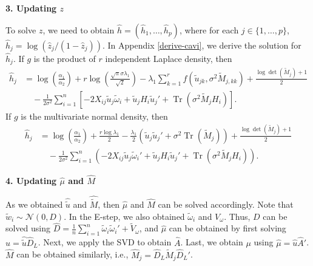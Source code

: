 \documentclass[pdftex, noinfoline, letter]{imsart}
\DeclareMathOperator{\Tr}{Tr}
\theoremstyle{plain}
\begin{document}
{\bf 3. Updating $z$}

To solve $z$, we need to obtain $\widehat  { h} = (\widehat  h_1, \dots, \widehat  h_p)$, where for each $j\in \{1,\ldots,p\}$,
$\widehat  h_j = \log(\widehat  z_j / (1-\widehat  z_j))$. 
In Appendix \ref{derive-cavi}, we derive the solution for $\widehat  h_j$. If $g$ is the product of $r$ independent Laplace density, then
\begin{align}
\label{eqn:cavi-z}
\widehat  h_j & =  
\log \left(\frac{\alpha_1}{\alpha_2}\right) + r \log \left(\frac{\sqrt{\pi} \sigma \lambda_1}{\sqrt{2}}\right)
- \lambda_1 \sum_{k=1}^r f(\widetilde  u_{jk}, \sigma^2 \widetilde  M_{j,kk}) + \frac{\log \det(\widetilde  M_j)+1}{2} 
\nonumber \\
& \quad 
- \frac{1}{2\sigma^2} \sum_{i=1}^n 
\left[
 - 2 X_{ij} \widetilde  u_j \widetilde  \omega_i +\widetilde  u_j H_i \widetilde  u_j' + \Tr(\sigma^2  \widetilde  M_j H_i)
\right].
\end{align} 
If $g$ is the multivariate normal density, then
\begin{align}
\label{eqn:cavi-z-mvn}
  \widehat  h_j & = \log \left(\frac{\alpha_1}{\alpha_2} \right) + \frac{r\log\lambda_1}{2} - 
    \frac{\lambda_1}{2}
    \left(
        \widetilde  u_j \widetilde  u_j'  + \sigma^2 \Tr(\widetilde  M_j)
    \right) + \frac{\log \det (\widetilde  M_j) + 1}{2} \nonumber \\
    & \quad    - \frac{1}{2\sigma^2}
        \sum_{i=1}^n 
        \left(
        - 2X_{ij} \widetilde  u_j \widetilde  \omega_i' + \widetilde  u_j H_i \widetilde  u_j' + \Tr(\sigma^2 \widetilde  M_jH_i)
        \right).
\end{align}
\smallskip

{\bf 4. Updating $\widehat  \mu$ and $\widehat  M$}

As we obtained $\widehat  {\widetilde  u}$ and $\widehat  {\widetilde  M}$, then $\widehat  \mu$ and $\widehat  M$ can be solved accordingly.
Note that $\widetilde  w_i \sim \mathcal{N}(0, D)$. In the E-step, we also obtained $\widetilde  \omega_i$ and $V_\omega$. Thus, $D$ can be solved using $\widehat  D = \frac{1}{n} \sum_{i=1}^n \widetilde  \omega_i \widetilde  \omega_i' + \widetilde  V_\omega$, and $\widehat  \mu$ can be obtained by first solving $\widehat  u = \widehat  {\widetilde  u} \widehat  D_L$. Next, we apply the SVD to obtain $\widehat  A$. Last, we obtain $\mu$ using $\widehat  \mu = \widehat  u \widehat  A'$. 
$\widehat  M$ can be obtained similarly, i.e., $\widehat  M_j = \widehat  D_L \widetilde  M_j \widehat  D_L'$. 
\medskip
\end{document}
